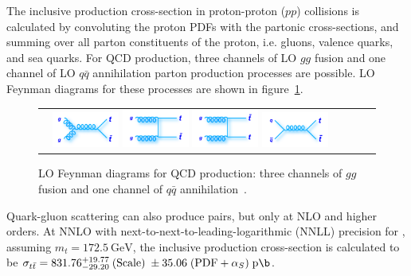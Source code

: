 The inclusive \ttbar production cross-section in proton-proton ($pp$) collisions is calculated by convoluting the proton PDFs with the partonic cross-sections, and summing over all parton constituents of the proton, i.e. gluons, valence quarks, and sea quarks.
For QCD \ttbar production, three channels of LO $gg$ fusion and one channel of LO $q\bar{q}$ annihilation parton production processes are possible.
LO Feynman diagrams for these processes are shown in figure~\ref{ttbar_production_LO_feynman_diagrams}.
\begin{figure}[htb]
  \begin{center}
    \begin{tabular}{cccc}
        \includegraphics[width=0.225\textwidth]{fig_TopQuark/feynman_ttbar_LHC_gggtt.png}
        \includegraphics[width=0.225\textwidth]{fig_TopQuark/feynman_ttbar_LHC_ggttt.png}
        \includegraphics[width=0.225\textwidth]{fig_TopQuark/feynman_ttbar_LHC_ggttbart.png}
        \includegraphics[width=0.225\textwidth]{fig_TopQuark/feynman_ttbar_LHC_qqgtt.png}
    \end{tabular}
    \caption{LO Feynman diagrams for QCD \ttbar production: three channels of $gg$ fusion and one channel of $q\bar{q}$ annihilation~\cite{d0_diagrams}.
            }
    \label{ttbar_production_LO_feynman_diagrams}
  \end{center}
\end{figure}
Quark-gluon scattering can also produce \ttbar pairs, but only at NLO and higher orders.
At NNLO with next-to-next-to-leading-logarithmic (NNLL) precision for \beamenergy, assuming $m_t = \SI{172.5}{\GeV}$, the inclusive \ttbar production cross-section is calculated to be $\sigma_{\ttbar} = 831.76 \substack{+19.77 \\ -29.20} \; (\text{Scale}) \; \pm 35.06 \; (\text{PDF} + \alpha_S) \; \si{\pico \b}$.
